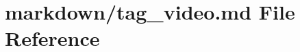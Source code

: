 \hypertarget{tag__video_8md}{}\section{markdown/tag\+\_\+video.md File Reference}
\label{tag__video_8md}
